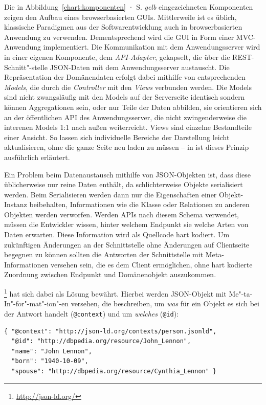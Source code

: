 Die in Abbildung~\ref{chart:komponenten} · S.\pageref{chart:komponenten} \emph{gelb} eingezeichneten Komponenten zeigen den Aufbau eines browserbasierten GUIs. Mittlerweile ist es üblich, klassische Paradigmen aus der Softwarentwicklung auch in browserbasierten Anwendung zu verwenden. Dementsprechend wird die GUI in Form einer MVC-Anwendung implementiert. Die Kommunikation mit dem Anwendungsserver wird in einer eigenen Komponente, dem \emph{API-Adapter}, gekapselt, die über die REST-Schnitt"-stelle JSON-Daten mit dem Anwendungsserver austauscht. Die Repräsentation der Domänendaten erfolgt dabei mithilfe von entsprechenden \emph{Models}, die durch die \emph{Controller} mit den \emph{Views} verbunden werden. Die Models sind nicht zwangsläufig mit den Models auf der Serverseite identisch sondern können Aggregationen sein, oder nur Teile der Daten abbilden, sie orientieren sich an der öffentlichen API des Anwendungsserver, die nicht zwingenderweise die interenen Models 1:1 nach außen weiterreicht. Views sind einzelne Bestandteile einer Ansicht. So lassen sich individuelle Bereiche der Darstellung leicht aktualisieren, ohne die ganze Seite neu laden zu müssen -- in \cite[S.1--5 und S.65--72]{maccaw2011javascript} ist dieses Prinzip ausführlich erläutert.

Ein Problem beim Datenaustausch mithilfe von JSON-Objekten ist, dass diese üblicherweise nur reine Daten enthält, da schlichterweise Objekte serialisiert werden. Beim Serialisieren werden dann nur die Eigenschaften einer Objekt-Instanz beibehalten, Informationen wie die Klasse oder Relationen zu anderen Objekten werden verworfen. Werden APIs nach diesem Schema verwendet, müssen die Entwickler wissen, hinter welchem Endpunkt sie welche Arten von Daten erwarten. Diese Information wird als Quellcode hart kodiert. Um zukünftigen Änderungen an der Schnittstelle ohne Änderungen auf Clientseite begegnen zu können sollten die Antworten der Schnittstelle mit Meta-Informationen versehen sein, die es dem Client ermöglichen, ohne hart kodierte Zuordnung zwischen Endpunkt und Domänenobjekt auszukommen. 

\begin{samepage}
\footnote{\url{http://json-ld.org/}} hat sich dabei als Lösung bewährt. Hierbei werden JSON-Objekt mit Me"-ta-In"-for"-mat"-ion"-en versehen, die beschreiben, um \emph{was} für ein Objekt es sich bei der Antwort handelt (\texttt{@context}) und um \emph{welches} (\texttt{@id}):

\begin{verbatim}
{ "@context": "http://json-ld.org/contexts/person.jsonld",
  "@id": "http://dbpedia.org/resource/John_Lennon",
  "name": "John Lennon",
  "born": "1940-10-09",
  "spouse": "http://dbpedia.org/resource/Cynthia_Lennon" }
\end{verbatim}
\end{samepage}

